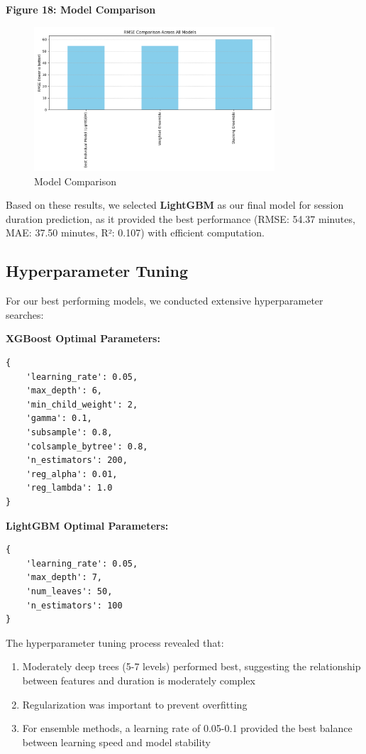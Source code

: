 \documentclass[12pt,letterpaper]{article}
\begin{document}
\textbf{Figure 18: Model Comparison}

\begin{figure}[H]
    \centering
    \includegraphics[width=0.8\textwidth]{duration_prediction/visualizations/model_comparison.png}
    \caption{Model Comparison}
\end{figure}

Based on these results, we selected \textbf{LightGBM} as our final model for session duration prediction, as it provided the best performance (RMSE: 54.37 minutes, MAE: 37.50 minutes, R²: 0.107) with efficient computation.

\subsection{Hyperparameter Tuning}

For our best performing models, we conducted extensive hyperparameter searches:

\textbf{XGBoost Optimal Parameters:}
\begin{verbatim}
{
    'learning_rate': 0.05,
    'max_depth': 6,
    'min_child_weight': 2,
    'gamma': 0.1,
    'subsample': 0.8,
    'colsample_bytree': 0.8,
    'n_estimators': 200,
    'reg_alpha': 0.01,
    'reg_lambda': 1.0
}
\end{verbatim}

\textbf{LightGBM Optimal Parameters:}
\begin{verbatim}
{
    'learning_rate': 0.05,
    'max_depth': 7,
    'num_leaves': 50,
    'n_estimators': 100
}
\end{verbatim}

The hyperparameter tuning process revealed that:
\begin{enumerate}
    \item Moderately deep trees (5-7 levels) performed best, suggesting the relationship between features and duration is moderately complex
    \item Regularization was important to prevent overfitting
    \item For ensemble methods, a learning rate of 0.05-0.1 provided the best balance between learning speed and model stability
\end{enumerate}
\end{document}
